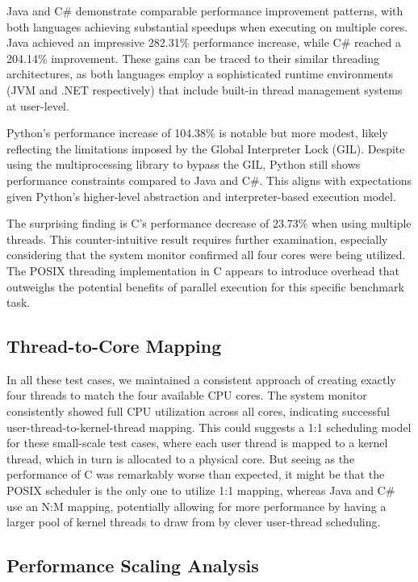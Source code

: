 \documentclass[12pt,a4paper]{article}
\begin{document}
Java and C\# demonstrate comparable performance improvement patterns, with both languages achieving substantial speedups when executing on multiple cores. Java achieved an impressive 282.31\% performance increase, while C\# reached a 204.14\% improvement. These gains can be traced to their similar threading architectures, as both languages employ a sophisticated runtime environments (JVM and .NET respectively) that include built-in thread management systems at user-level.

Python's performance increase of 104.38\% is notable but more modest, likely reflecting the limitations imposed by the Global Interpreter Lock (GIL). Despite using the multiprocessing library to bypass the GIL, Python still shows performance constraints compared to Java and C\#. This aligns with expectations given Python's higher-level abstraction and interpreter-based execution model.

The surprising finding is C's performance decrease of 23.73\% when using multiple threads. This counter-intuitive result requires further examination, especially considering that the system monitor confirmed all four cores were being utilized. The POSIX threading implementation in C appears to introduce overhead that outweighs the potential benefits of parallel execution for this specific benchmark task.

\subsection{Thread-to-Core Mapping}

In all these test cases, we maintained a consistent approach of creating exactly four threads to match the four available CPU cores. The system monitor consistently showed full CPU utilization across all cores, indicating successful user-thread-to-kernel-thread mapping. This could suggests a 1:1 scheduling model for these small-scale test cases, where each user thread is mapped to a kernel thread, which in turn is allocated to a physical core. But seeing as the performance of C was remarkably worse than expected, it might be that the POSIX scheduler is the only one to utilize 1:1 mapping, whereas Java and C\# use an N:M mapping, potentially allowing for more performance by having a larger pool of kernel threads to draw from by clever user-thread scheduling.

\subsection{Performance Scaling Analysis}
\end{document}
